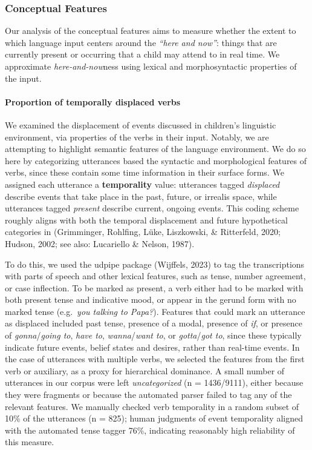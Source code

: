 \documentclass[
  man]{apa6}
\let\oldparagraph\paragraph
\renewcommand{\paragraph}[1]{\oldparagraph{#1}\mbox{}}
\begin{document}
\hypertarget{conceptual-features}{%
\subsubsection{Conceptual Features}\label{conceptual-features}}

Our analysis of the conceptual features aims to measure whether the extent to which language input centers around the \emph{``here and now''}: things that are currently present or occurring that a child may attend to in real time. We approximate \emph{here-and-now}ness using lexical and morphosyntactic properties of the input.

\hypertarget{proportion-of-temporally-displaced-verbs}{%
\paragraph{Proportion of temporally displaced verbs}\label{proportion-of-temporally-displaced-verbs}}

We examined the displacement of events discussed in children's linguistic environment, via properties of the verbs in their input. Notably, we are attempting to highlight semantic features of the language environment. We do so here by categorizing utterances based the syntactic and morphological features of verbs, since these contain some time information in their surface forms. We assigned each utterance a \textbf{temporality} value: utterances tagged \emph{displaced} describe events that take place in the past, future, or irrealis space, while utterances tagged \emph{present} describe current, ongoing events. This coding scheme roughly aligns with both the temporal displacement and future hypothetical categories in (Grimminger, Rohlfing, Lüke, Liszkowski, \& Ritterfeld, 2020; Hudson, 2002; see also: Lucariello \& Nelson, 1987).

To do this, we used the udpipe package (Wijffels, 2023) to tag the transcriptions with parts of speech and other lexical features, such as tense, number agreement, or case inflection. To be marked as present, a verb either had to be marked with both present tense and indicative mood, or appear in the gerund form with no marked tense (e.g.~\emph{you talking to Papa?}). Features that could mark an utterance as displaced included past tense, presence of a modal, presence of \emph{if}, or presence of \emph{gonna}/\emph{going to}, \emph{have to}, \emph{wanna}/\emph{want to}, or \emph{gotta}/\emph{got to}, since these typically indicate future events, belief states and desires, rather than real-time events. In the case of utterances with multiple verbs, we selected the features from the first verb or auxiliary, as a proxy for hierarchical dominance. A small number of utterances in our corpus were left \emph{uncategorized} (n = 1436/9111), either because they were fragments or because the automated parser failed to tag any of the relevant features. We manually checked verb temporality in a random subset of 10\% of the utterances (n = 825); human judgments of event temporality aligned with the automated tense tagger 76\%, indicating reasonably high reliability of this measure.
\end{document}
